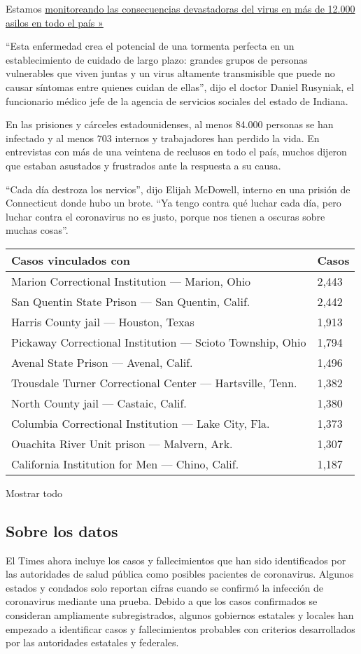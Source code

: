 Estamos
\href{https://www.nytimes.com/interactive/2020/us/coronavirus-nursing-homes.html}{monitoreando
las consecuencias devastadoras del virus en más de 12.000 asilos en todo
el país »}

``Esta enfermedad crea el potencial de una tormenta perfecta en un
establecimiento de cuidado de largo plazo: grandes grupos de personas
vulnerables que viven juntas y un virus altamente transmisible que puede
no causar síntomas entre quienes cuidan de ellas'', dijo el doctor
Daniel Rusyniak, el funcionario médico jefe de la agencia de servicios
sociales del estado de Indiana.

En las prisiones y cárceles estadounidenses, al menos 84.000 personas se
han infectado y al menos 703 internos y trabajadores han perdido la
vida. En entrevistas con más de una veintena de reclusos en todo el
país, muchos dijeron que estaban asustados y frustrados ante la
respuesta a su causa.

``Cada día destroza los nervios'', dijo Elijah McDowell, interno en una
prisión de Connecticut donde hubo un brote. ``Ya tengo contra qué luchar
cada día, pero luchar contra el coronavirus no es justo, porque nos
tienen a oscuras sobre muchas cosas''.

\begin{longtable}[]{@{}ll@{}}
\toprule
Casos vinculados con & Casos\tabularnewline
\midrule
\endhead
Marion Correctional Institution --- Marion, Ohio & 2,443 \tabularnewline
San Quentin State Prison --- San Quentin, Calif. & 2,442 \tabularnewline
Harris County jail --- Houston, Texas & 1,913 \tabularnewline
Pickaway Correctional Institution --- Scioto Township, Ohio & 1,794
\tabularnewline
Avenal State Prison --- Avenal, Calif. & 1,496 \tabularnewline
Trousdale Turner Correctional Center --- Hartsville, Tenn. & 1,382
\tabularnewline
North County jail --- Castaic, Calif. & 1,380 \tabularnewline
Columbia Correctional Institution --- Lake City, Fla. & 1,373
\tabularnewline
Ouachita River Unit prison --- Malvern, Ark. & 1,307 \tabularnewline
California Institution for Men --- Chino, Calif. & 1,187 \tabularnewline
\bottomrule
\end{longtable}

Mostrar todo

\hypertarget{sobre-los-datos}{%
\subsection{Sobre los datos}\label{sobre-los-datos}}

El Times ahora incluye los casos y fallecimientos que han sido
identificados por las autoridades de salud pública como posibles
pacientes de coronavirus. Algunos estados y condados solo reportan
cifras cuando se confirmó la infección de coronavirus mediante una
prueba. Debido a que los casos confirmados se consideran ampliamente
subregistrados, algunos gobiernos estatales y locales han empezado a
identificar casos y fallecimientos probables con criterios desarrollados
por las autoridades estatales y federales.

